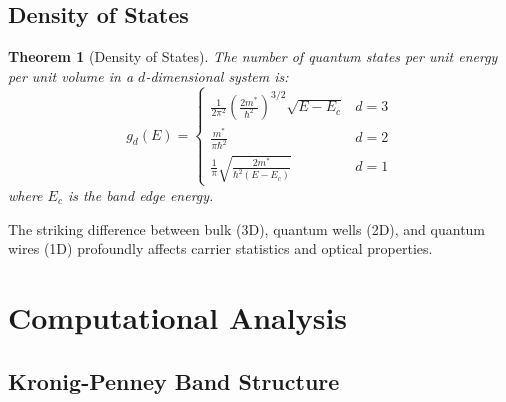 \documentclass[11pt,a4paper]{article}
\newtheorem{theorem}{Theorem}[section]
\begin{document}
\subsection{Density of States}

\begin{theorem}[Density of States]
The number of quantum states per unit energy per unit volume in a $d$-dimensional system is:
\begin{equation}
g_d(E) = \begin{cases}
\frac{1}{2\pi^2}\left(\frac{2m^*}{\hbar^2}\right)^{3/2}\sqrt{E - E_c} & d=3 \\
\frac{m^*}{\pi\hbar^2} & d=2 \\
\frac{1}{\pi}\sqrt{\frac{2m^*}{\hbar^2(E-E_c)}} & d=1
\end{cases}
\end{equation}
where $E_c$ is the band edge energy.
\end{theorem}

The striking difference between bulk (3D), quantum wells (2D), and quantum wires (1D)
profoundly affects carrier statistics and optical properties.

\section{Computational Analysis}

\subsection{Kronig-Penney Band Structure}
\end{document}

